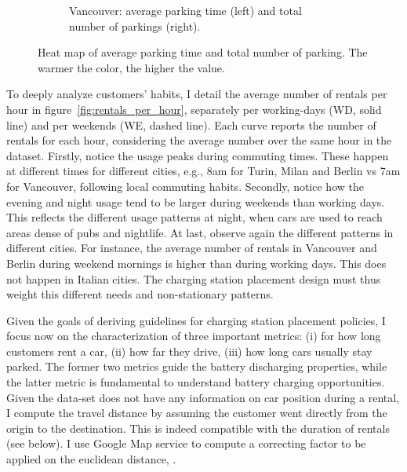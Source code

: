 \begin{figure}[t!]
\begin{center}
\begin{subfigure}{\textwidth}
\begin{center}
            \captionsetup{justification=centering}
            \caption{Vancouver: average parking time (left) and total number of parkings (right).}
            \label{fig:heatmap_vancouver}
            \end{center}
        \end{subfigure}
          \caption{Heat map of average parking time and total number of parking. The warmer the color, the higher the value.}
         \label{fig:heatmaps}
\end{center}
\end{figure}

To deeply analyze customers' habits, I detail the average number of rentals per hour in figure~\ref{fig:rentals_per_hour}, separately per working-days (WD, solid line) and per weekends (WE, dashed line). Each curve reports the number of rentals for each hour, considering the average number over the same hour in the dataset.
Firstly, notice the usage peaks during commuting times. These happen at different times for different cities, e.g., 8am for Turin, Milan and Berlin vs 7am for Vancouver, following local commuting habits. Secondly, notice how the evening and night usage tend to be larger during  weekends than working days. This reflects the different usage patterns at night, when cars are used to reach areas dense of pubs and nightlife.
At last, observe again the different patterns in different cities. For instance, the average number of rentals in Vancouver and Berlin during weekend mornings is higher than during working days. This does not happen in Italian cities. The charging station placement design must thus weight this different needs and non-stationary patterns.


Given the goals of deriving guidelines for charging station placement policies, I focus now on the characterization of three important metrics:
(i) for how long customers rent a car,
(ii) how far they drive,
(iii) how long cars usually stay parked.
The former two metrics guide the battery discharging properties, while the latter metric is fundamental to understand battery charging opportunities. Given the data-set does not have any information on car position during a rental, I compute the travel distance by assuming the customer went directly from the origin to the destination. This is indeed compatible with the duration of rentals (see below). I use Google Map service to compute a correcting factor to be applied on the euclidean distance, . 


